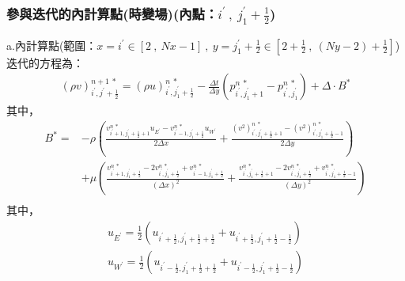 \documentclass[12pt]{article}
\begin{document}
\subsubsection{參與迭代的內計算點(時變場)(內點：$i^{\prime}\ ,\ j_{1}^{\prime}+\frac{1}{2}$)}
\noindent a.內計算點(範圍：$x = i^{\prime} \in [2\ ,\ Nx-1]\ ,\ y = j_{1}^{\prime}+\frac{1}{2}\in [2+\frac{1}{2}\ ,\ (Ny-2)+\frac{1}{2}]$)\\[1.5ex]
\noindent 迭代的方程為：
\begin{equation}\begin{split}
    (\rho v)_{i^{\prime},j^{\prime}+\frac{1}{2}}^{n+1\ *} = (\rho u)_{i^{\prime},j_{1}^{\prime}+\frac{1}{2}}^{n\ *} -\frac{\Delta t}{\Delta y}(p_{i^{\prime},j_{1}^{\prime}+1}^{n\ *} - p_{i^{\prime},j_{1}^{\prime}}^{n\ *}) + \Delta \cdot B^{*}
\end{split}\end{equation}
\noindent 其中，
\begin{equation*}\begin{split}
    B^{*}=
    &-\rho(\frac{v_{i^{\prime}+1,j_{1}^{\prime}+\frac{1}{2}+1}^{n\ *} u_{E^{\prime}} - v_{i^{\prime}-1,j_{1}^{\prime}+\frac{1}{2}}^{n\ *}u_{W^{\prime}}}{2\Delta x}+\frac{(v^{2})_{i^{\prime},j_{1}^{\prime}+\frac{1}{2}+1}^{n\ *} - (v^{2})_{i^{\prime},j_{1}^{\prime}+\frac{1}{2}-1}^{n\ *}}{2\Delta y})\\[1.5ex]
    &+\mu(\frac{v_{i^{\prime}+1,j_{1}^{\prime}+\frac{1}{2}}^{n\ *}-2v_{i^{\prime},j_{1}^{\prime}+\frac{1}{2}}^{n\ *}+v_{i^{\prime}-1,j_{1}^{\prime}+\frac{1}{2}}^{n\ *}}{(\Delta x)^{2}} + \frac{v_{i^{\prime},j_{1}^{\prime}+\frac{1}{2}+1}^{n\ *}-2v_{i^{\prime},j_{1}^{\prime}+\frac{1}{2}}^{n\ *}+v_{i^{\prime},j_{1}^{\prime}+\frac{1}{2}-1}^{n\ *}}{(\Delta y)^{2}})\\[1.5ex]
\end{split}\end{equation*}
\noindent 其中，
\begin{equation*}\begin{split}
    u_{E^{\prime}} = \frac{1}{2}(u_{i^{\prime}+\frac{1}{2},j_{1}^{\prime}+\frac{1}{2}+\frac{1}{2}}+u_{i^{\prime}+\frac{1}{2},j_{1}^{\prime}+\frac{1}{2}-\frac{1}{2}})\\[1.5ex]
    u_{W^{\prime}} = \frac{1}{2}(u_{i^{\prime}-\frac{1}{2},j_{1}^{\prime}+\frac{1}{2}+\frac{1}{2}}+u_{i^{\prime}-\frac{1}{2},j_{1}^{\prime}+\frac{1}{2}-\frac{1}{2}})\\[1.5ex]
\end{split}\end{equation*}
\end{document}
